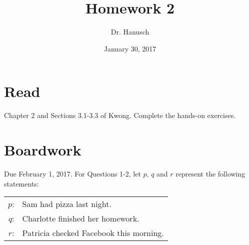 \documentclass[12pt]{article}
\title{Homework 2}
\author{Dr. Hanusch}  %
\date{January 30, 2017}
\begin{document}
\newtheorem{thm}{Theorem}[section]
\newtheorem{cor}[thm]{Corollary}
\newtheorem{lem}[thm]{Lemma}
\newtheorem{prop}[thm]{Proposition}
\theoremstyle{definition}
\newtheorem{defn}[thm]{Definition}
\newtheorem{qu}[]{Question}
\theoremstyle{remark}
\newtheorem{rem}[thm]{Remark}
\newtheorem{prf}[]{Proof}

\newcommand{\norm}[1]{\left\Vert#1\right\Vert}
\newcommand{\abs}[1]{\left\vert#1\right\vert}
\newcommand{\set}[1]{\left\{#1\right\}}
\newcommand{\Real}{\mathbb R}
\newcommand{\eps}{\varepsilon}
\newcommand{\To}{\longrightarrow}
\newcommand{\BX}{\mathbf{B}(X)}
\newcommand{\A}{\mathcal{A}}



\maketitle

\section{Read}

Chapter 2 and Sections 3.1-3.3 of Kwong. Complete the hands-on exercises.

\section{Boardwork}

Due February 1, 2017.
For Questions 1-2, let $p$, $q$ and $r$ represent the following statements:

\begin{center}\begin{tabular}{rl}
$p$: & Sam had pizza last night.\\
$q$: & Charlotte finished her homework. \\
$r$: & Patricia checked Facebook this morning.
\end{tabular} \end{center}
\end{document}
